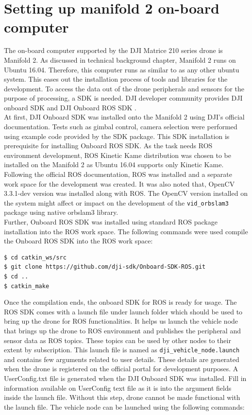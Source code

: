 \section{Setting up manifold 2 on-board computer}
\label{sec:concept:settingupmanifold}
The on-board computer supported by the DJI Matrice 210 series drone is Manifold 2. As discussed in technical background chapter, Manifold 2 runs on Ubuntu 16.04. Therefore, this computer runs as similar to as any other ubuntu system. This eases out the installation process of tools and libraries for the development. To access the data out of the drone peripherals and sensors for the purpose of processing, a SDK is needed. DJI developer community provides DJI onboard SDK \cite{DJI_OSDK} and DJI Onboard ROS SDK \cite{DJI_OSDK_ROS}. \\

At first, DJI Onboard SDK was installed onto the Manifold 2 using DJI's official documentation. Tests such as gimbal control, camera selection were performed using example code provided by the SDK package. This SDK installation is prerequisite for installing Onboard ROS SDK. As the task needs ROS environment development, ROS Kinetic Kame distribution was chosen to be installed on the Manifold 2 as Ubuntu 16.04 supports only Kinetic Kame. Following the official ROS documentation, ROS was installed and a separate work space for the development was created. It was also noted that, OpenCV 3.3.1-dev version was installed along with ROS. The OpenCV version installed on the system might affect or impact on the development of the \texttt{vid\_orbslam3} package using native orbslam3 library. \\

Further, Onboard ROS SDK was installed using standard ROS package installation into the ROS work space. The following commands were used compile the Onboard ROS SDK into the ROS work space:

\begin{lstlisting}[language=bash, basicstyle=\small]
$ cd catkin_ws/src
$ git clone https://github.com/dji-sdk/Onboard-SDK-ROS.git
$ cd ..
$ catkin_make 
\end{lstlisting}

Once the compilation ends, the onboard SDK for ROS is ready for usage. The ROS SDK comes with a launch file under launch folder which should be used to bring up the drone for ROS functionalities. It helps us launch the vehicle node that brings up the drone to ROS environment and publishes the peripheral and sensor data as ROS topics. These topics can be used by other nodes to their extent by subscription. This launch file is named as \texttt{dji\_vehicle\_node.launch} and contains few arguments related to user details. These details are generated when the drone is registered on the official portal for development purposes. A UserConfig.txt file is generated when the DJI Onboard SDK was installed. Fill in information available on UserConfig text file as it is into the argument fields inside the launch file. Without this step, drone cannot be made functional with the launch file. The vehicle node can be launched using the following commands:

